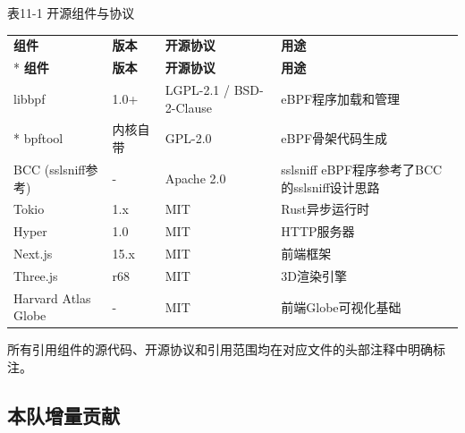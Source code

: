\documentclass[a4paper]{ctexart}
\makeatletter
\renewcommand{\_}{%
  \ifmmode
    \nfss@text{\textunderscore}%
  \else
    \textunderscore\discretionary{}{}{}%
  \fi}
\makeatother
\begin{document}
\medskip
{\centering\small
表11-1 开源组件与协议\par
\vspace{3pt}
\setlength{\tabcolsep}{6pt}
\renewcommand{\arraystretch}{1.1}
\begin{longtable}{p{4.5cm} p{2.0cm} >{\raggedright\arraybackslash}p{3.9cm} >{\raggedright\arraybackslash}p{3.9cm}}
\hline
\textbf{组件} & \textbf{版本} & \textbf{开源协议} & \textbf{用途} \\*
\hline
\endfirsthead
\hline
\textbf{组件} & \textbf{版本} & \textbf{开源协议} & \textbf{用途} \\
\hline
\endhead
\hline
\endfoot
\hline
\endlastfoot
libbpf & 1.0+ & LGPL-2.1 / BSD-2-Clause & eBPF程序加载和管理 \\*
\hline
bpftool & 内核自带 & GPL-2.0 & eBPF骨架代码生成 \\
\hline
BCC (sslsniff参考) & - & Apache 2.0 & sslsniff eBPF程序参考了BCC的sslsniff设计思路 \\
\hline
Tokio & 1.x & MIT & Rust异步运行时 \\
\hline
Hyper & 1.0 & MIT & HTTP服务器 \\
\hline
Next.js & 15.x & MIT & 前端框架 \\
\hline
Three.js & r68 & MIT & 3D渲染引擎 \\
\hline
Harvard Atlas Globe & - & MIT & 前端Globe可视化基础 \\
\hline
\end{longtable}
\par}



所有引用组件的源代码、开源协议和引用范围均在对应文件的头部注释中明确标注。


\subsection{本队增量贡献}
\end{document}
